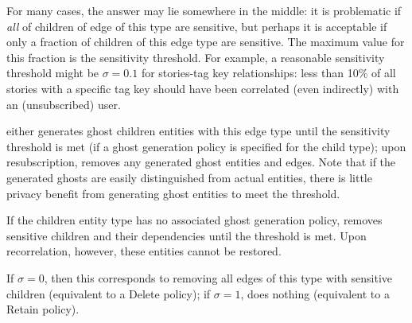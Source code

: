 \begin{itemize}
        For many cases, the answer may lie somewhere in the middle: it is problematic if \emph{all} of
        children of edge of this type are sensitive, but perhaps it is acceptable if only a fraction of
        children of this edge type are sensitive. The maximum value for this fraction is the sensitivity threshold.
        For example, a reasonable sensitivity threshold might be $\sigma = 0.1$ for stories-tag key relationships:
        less than 10\% of all stories with a specific tag key should have been correlated (even
        indirectly) with an (unsubscribed) user. 

        \sys{} either generates ghost children entities with this edge type until the
        sensitivity threshold is met (if a ghost generation policy is specified for the child type); upon
        resubscription, \sys{} removes any generated ghost entities and edges.
        Note that if the generated ghosts are easily distinguished from actual entities, there is
        little privacy benefit from generating ghost entities to meet the threshold.

        If the children entity type has no associated ghost generation policy, \sys{} removes
        sensitive children and their dependencies until the threshold is met.  Upon recorrelation,
        however, these entities cannot be restored.

        If $\sigma = 0$, then this corresponds to removing all edges of this type
        with sensitive children (equivalent to a Delete policy); if $\sigma = 1$, \sys{} does
        nothing (equivalent to a Retain policy).
    \end{itemize}

